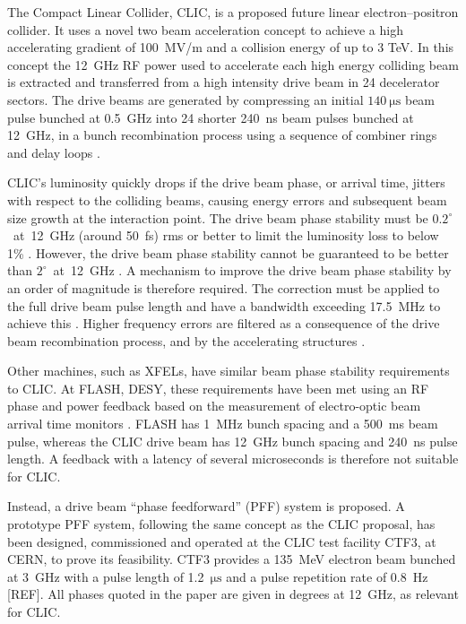 \documentclass[%
 reprint,
superscriptaddress,
 amsmath,amssymb,
 prl,
]{revtex4-1}
\begin{document}
The Compact Linear Collider, CLIC, \cite{CLICCDR} is a proposed future 
linear electron--positron collider. It uses a novel two beam acceleration 
concept to achieve a high accelerating gradient of 100~MV/m 
and a collision energy of up to 3 TeV. In this concept the 12~GHz RF power used 
to accelerate each high energy colliding beam is extracted and transferred from 
a high intensity drive beam in 24 decelerator sectors. The 
drive beams are generated by compressing an initial 
\(140~\mathrm{\mu s}\) beam pulse bunched at 0.5~GHz into 24 shorter 240~ns 
beam pulses bunched at 12~GHz, in a bunch recombination process using a 
sequence of combiner rings and delay loops \cite{CLICCDR}.

CLIC's luminosity quickly drops if the drive beam phase, or arrival time, 
jitters with respect to the colliding beams, causing energy errors and 
subsequent beam size growth at the interaction point. The drive beam phase 
stability must be \(0.2^\circ\)~at~12~GHz (around 50~fs) rms or better to limit 
the luminosity loss to below 1\% \cite{CLICCDR}.  However, the drive beam phase 
stability cannot be guaranteed to be better than \(2^\circ\)~at~12~GHz 
\cite{CLICCDR}. A 
mechanism to improve the drive beam phase stability by an order of magnitude is 
therefore required. The correction must be applied to the full drive beam pulse 
length and have a bandwidth exceeding 17.5~MHz to achieve this 
\cite{Gerber2015}. Higher frequency errors are filtered as a consequence of the 
drive beam recombination process, and by the accelerating structures 
\cite{Gerber2015}.

Other machines, such as XFELs, have similar beam phase stability 	
requirements to CLIC. At FLASH, DESY, these requirements have been met using 
an RF phase and power feedback based on the measurement of electro-optic beam 
arrival time monitors \cite{flashPRL}. 
FLASH has 1~MHz bunch spacing and a 
500~ms beam pulse, whereas the CLIC drive beam has 12~GHz bunch spacing and 
240~ns pulse length. A feedback with a latency of several microseconds is 
therefore not suitable for CLIC.

Instead, a drive beam ``phase feedforward'' (PFF) 
system is proposed. A prototype PFF system, following the same concept as the 
CLIC proposal, has been designed, commissioned and 
operated at 
the CLIC test facility CTF3, at CERN, to prove its feasibility. CTF3 provides a 
135~MeV 
electron beam bunched at 3~GHz with a 
pulse length of 1.2~\(\mathrm{\mu s}\) and a pulse repetition rate of 0.8~Hz 
[REF]. All phases quoted in the paper are given in degrees at 12~GHz, as 
relevant for CLIC.
\end{document}
